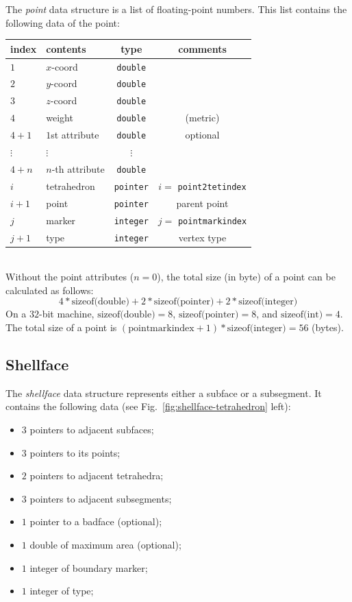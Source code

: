 The {\it point} data structure is a list of floating-point numbers. This list contains the following data of the point:\\
\begin{tabular}{l | l | c | c}
 index & contents & type & comments\\ \hline
 $1$ & $x$-coord & {\tt double} & \\
 $2$ & $y$-coord & {\tt double} & \\
 $3$ & $z$-coord & {\tt double} & \\ \hline
 $4$ & weight    & {\tt double} & (metric) \\ \hline
 $4 + 1$ & $1$st attribute & {\tt double} & optional \\
 $\vdots$ & $\vdots$ & $\vdots$ & \\
 $4 + n$ & $n$-th attribute & {\tt double} & \\ \hline
 $i$ & tetrahedron & {\tt pointer} & $i =$ {\tt point2tetindex} \\
 $i + 1$ & point & {\tt pointer} & parent point\\ \hline
 $j$ & marker & {\tt integer} & $j = $ {\tt pointmarkindex}\\
 $j + 1$ & type & {\tt integer} & vertex type
\end{tabular}\\

Without the point attributes ($n = 0$), the total size (in byte) of a point can be calculated as follows:
\[
  4 * \textrm{sizeof(double)} + 2 * \textrm{sizeof(pointer)} + 2 * \textrm{sizeof(integer)}
\]
On a $32$-bit machine, $\textrm{sizeof(double)} = 8$, $\textrm{sizeof(pointer)} = 8$, and $\textrm{sizeof(int)} = 4$. The total size of a point is $(\textrm{pointmarkindex} + 1) * \textrm{sizeof(integer)} = 56$ (bytes).

\subsection{Shellface}

The {\it shellface} data structure represents either a subface or a subsegment. It contains the following data (see Fig.~\ref{fig:shellface-tetrahedron} left):
\begin{itemize}
\item $3$ pointers to adjacent subfaces;
\item $3$ pointers to its points;
\item $2$ pointers to adjacent tetrahedra;
\item $3$ pointers to adjacent subsegments;
\item $1$ pointer to a badface (optional);
\item $1$ double of maximum area (optional);
\item $1$ integer of boundary marker;
\item $1$ integer of type;
\end{itemize}

